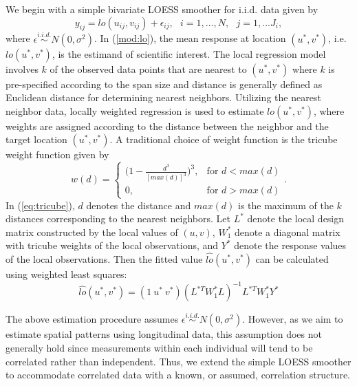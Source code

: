 	We begin with a simple bivariate LOESS smoother for i.i.d. data given by
	\begin{equation} \label{mod:lo}
	y_{ij}=lo(u_{ij},v_{ij})+\epsilon_{ij},~~~i=1,\dots,N,~~~j=1,...J_i,
	\end{equation}
	where $\epsilon \stackrel{i.i.d.}{\sim} N(0,\sigma^2)$. In (\ref{mod:lo}), the mean response at location $(u^*,v^*)$, i.e. $lo(u^*,v^*)$, is the estimand of scientific interest.  The local regression model involves $k$ of the observed data points that are nearest to $(u^*,v^*)$ where $k$ is pre-specified according to the span size and distance is generally defined as Euclidean distance for determining nearest neighbors. Utilizing the nearest neighbor data, locally weighted regression is used to estimate $lo(u^*,v^*)$, where weights are assigned according to the distance between the neighbor and the target location $(u^*,v^*)$. A traditional choice of weight function is the tricube weight function given by 
	\begin{equation} \label{eq:tricube}
	w(d) = \begin{cases} \Big( 1-\frac{d^3}{[max(d)]^3} \Big)^3, &\mbox{for } d < max(d)\\
	0, & \mbox{for } d > max(d) \end{cases}.
	\end{equation}
	\noindent In (\ref{eq:tricube}), $d$ denotes the distance and $max(d)$ is the maximum of the $k$ distances corresponding to the nearest neighbors. Let $L^*$ denote the local design matrix constructed by the local values of $(u,v)$, $W_1^*$ denote a diagonal matrix with tricube weights of the local observations, and $Y^*$ denote the response values of the local observations. Then the fitted value $\hat{lo}(u^*,v^*)$ can be calculated using weighted least squares:
	\begin{equation} \label{eq:wls}
	\hat{lo}(u^*,v^*)=(1\ u^*\ v^*)(L^{*T}W_1^*L)^{-1}L^{*T}W_1^*Y^*
	\end{equation}
	
	The above estimation procedure assumes $\epsilon \stackrel{i.i.d.}{\sim} N(0,\sigma^2)$. However, as we aim to estimate spatial patterns using longitudinal data, this assumption does not generally hold since measurements within each individual will tend to be correlated rather than independent. Thus, we extend the simple LOESS smoother to accommodate correlated data with a known, or assumed, correlation structure. 
	
